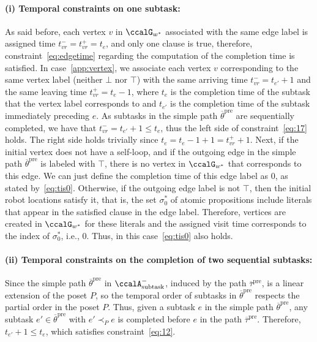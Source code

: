 \documentclass[Afour,sageh,times]{sagej}
\newcommand{\auto}[1]{\ccalA_{\textup{#1}}}
\begin{document}
{{\paragraph{(i) Temporal constraints on one subtask:} As said before, each vertex $v$ in $\ccalG_{w^*}$ associated with the same edge label is assigned time $t_{vr}^- = t_{vr}^+ = t_e$, and only one clause is true, therefore, constraint~\eqref{eq:edgetime} regarding the computation of the completion time is satisfied. In case~\ref{app:vertex}, we associate each vertex $v$ corresponding to the same vertex label (neither $\bot$ nor $\top$) with the same arriving time $t_{vr}^- = t_{e'}+1$ and the same leaving time $t_{vr}^+ = t_{e}-1$, where $t_e$ is the completion time of the subtask that the vertex label corresponds to and $t_{e'}$ is the completion time of the subtask immediately preceding $e$. As subtasks in  the simple path $\overline{\theta}^{\text{pre}}$ are sequentially completed, we have that $t_{vr}^- = t_{e'}+1\leq t_e$, thus the left side of constraint~\eqref{eq:17} holds. The right side holds trivially since $t_e = t_e-1+1 = t_{vr}^+ +1$. Next, if the initial vertex does not have a self-loop, and if the outgoing edge in the simple path $\overline{\theta}^{\text{pre}}$ is labeled with $\top$, there is no vertex in $\ccalG_{w^*}$ that corresponds to this edge. We can just define the completion time of this edge label as 0, as stated by~\eqref{eq:tis0}. Otherwise, if the outgoing edge label is not $\top$, then the initial robot locations  satisfy it, that is, the set $\sigma^*_0$ of atomic propositions include literals that appear in the satisfied clause in the edge label.
Therefore, vertices are created in $\ccalG_{w^*}$ for these literals and the assigned visit time corresponds to the index of $\sigma_0^*$, i.e., 0. Thus, in this case~\eqref{eq:tis0} also holds.

\paragraph{(ii) Temporal constraints on the completion of two sequential subtasks:}
Since the simple path $\overline{\theta}^{\text{pre}}$ in $\auto{subtask}^-$, induced by the path $\overline{\tau}^\text{pre}$, is a linear extension of the poset $P$, so  the temporal  order of subtasks in $\overline{\theta}^{\text{pre}}$ respects the partial order in the poset $P$. Thus, given a subtask $e$ in the simple path $\overline{\theta}^{\text{pre}}$, any subtask $e'\in \overline{\theta}^{\text{pre}}$ with $e' \prec_P e$ is completed before $e$ in the path $\overline{\tau}^\text{pre}$. Therefore, $t_{e'} +1 \leq t_e$, which satisfies constraint~\eqref{eq:12}.
}}
\end{document}
